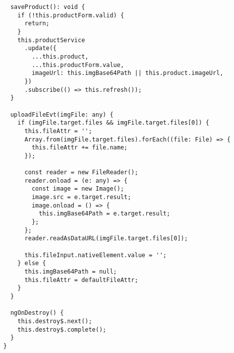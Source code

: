 \begin{lstlisting}
      saveProduct(): void {
        if (!this.productForm.valid) {
          return;
        }
        this.productService
          .update({
            ...this.product,
            ...this.productForm.value,
            imageUrl: this.imgBase64Path || this.product.imageUrl,
          })
          .subscribe(() => this.refresh());
      }
    
      uploadFileEvt(imgFile: any) {
        if (imgFile.target.files && imgFile.target.files[0]) {
          this.fileAttr = '';
          Array.from(imgFile.target.files).forEach((file: File) => {
            this.fileAttr += file.name;
          });
    
          const reader = new FileReader();
          reader.onload = (e: any) => {
            const image = new Image();
            image.src = e.target.result;
            image.onload = () => {
              this.imgBase64Path = e.target.result;
            };
          };
          reader.readAsDataURL(imgFile.target.files[0]);
    
          this.fileInput.nativeElement.value = '';
        } else {
          this.imgBase64Path = null;
          this.fileAttr = defaultFileAttr;
        }
      }
    
      ngOnDestroy() {
        this.destroy$.next();
        this.destroy$.complete();
      }
    }    
\end{lstlisting}

